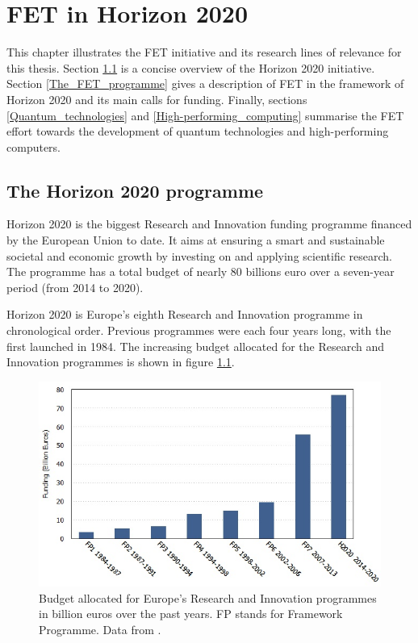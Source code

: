 \chapter{FET in Horizon 2020}
This chapter illustrates the FET initiative and its research lines of relevance for this thesis. Section \ref{The_Horizon_2020_programme} is a concise overview of the Horizon 2020 initiative. Section \ref{The_FET_programme} gives a description of FET in the framework of Horizon 2020 and its main calls for funding. Finally, sections \ref{Quantum_technologies} and \ref{High-performing_computing} summarise the FET effort towards the development of quantum technologies and high-performing computers.

\section{The Horizon 2020 programme} \label{The_Horizon_2020_programme}
Horizon 2020 is the biggest Research and Innovation funding programme financed by the European Union to date. It aims at ensuring a smart and sustainable societal and economic growth by investing on and applying scientific research. The programme has a total budget of nearly 80 billions euro over a seven-year period (from 2014 to 2020).

Horizon 2020 is Europe's eighth Research and Innovation programme in chronological order. Previous programmes were each four years long, with the first launched in 1984. The increasing budget allocated for the Research and Innovation programmes is shown in figure \ref{FP_funds}.

\begin{figure}[!t] 
 \begin{center}
 \includegraphics[scale=0.4]{Images/FP_funds.jpg}
 \caption{Budget allocated for Europe's Research and Innovation programmes in billion euros over the past years. FP stands for Framework Programme. Data from \cite{OECD}.}
 \label{FP_funds}
 \end{center}
\end{figure}

